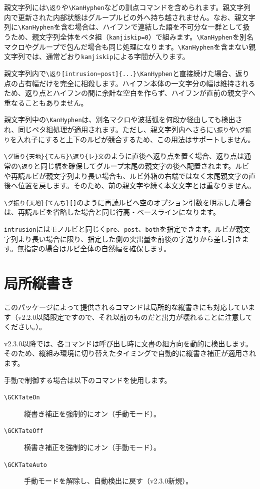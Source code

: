 \documentclass[luatex,fontsize=8pt,paper=b5,twoside]{jlreq}%
\begin{document}
親文字列には\verb|\返り|や\verb|\KanHyphen|などの訓点コマンドを含められます。親文字列内で更新された内部状態はグループルビの外へ持ち越されません。なお、親文字列に\verb|\KanHyphen|を含む場合は、ハイフンで連結した語を不可分な一群として扱うため、親文字列全体をベタ組（\verb|kanjiskip=0|）で組みます。\verb|\KanHyphen|を別名マクロやグループで包んだ場合も同じ処理になります。\verb|\KanHyphen|を含まない親文字列では、通常どおり\verb|kanjiskip|による字間が入ります。

親文字列内で\verb|\返り[intrusion=post]{...}\KanHyphen|と直接続けた場合、返り点の占有幅だけを完全に相殺します。ハイフン本体の一文字分の幅は維持されるため、返り点とハイフンの間に余計な空白を作らず、ハイフンが直前の親文字へ重なることもありません。

親文字列中の\verb|\KanHyphen|は、別名マクロや波括弧を何段か経由しても検出され、同じベタ組処理が適用されます。ただし、親文字列内へさらに\verb|\振り|や\verb|\グ振り|を入れ子にすると上下のルビが競合するため、この用法はサポートしません。

\verb|\グ振り{天地}{てんち}\返り{レ}文|のように直後へ返り点を置く場合、返り点は通常の\verb|\返り|と同じ幅を確保してグループ末尾の親文字の後へ配置されます。ルビや再読ルビが親文字列より長い場合も、ルビ外箱の右端ではなく末尾親文字の直後へ位置を戻します。そのため、前の親文字や続く本文文字とは重なりません。

\verb|\グ振り{天地}{てんち}[]|のように再読ルビへ空のオプション引数を明示した場合は、再読ルビを省略した場合と同じ行高・ベースラインになります。

\verb|intrusion|にはモノルビと同じく\verb|pre|、\verb|post|、\verb|both|を指定できます。ルビが親文字列より長い場合に限り、指定した側の突出量を前後の字送りから差し引きます。無指定の場合はルビ全体の自然幅を確保します。

\section{局所縦書き}
このパッケージによって提供されるコマンドは局所的な縦書きにも対応しています（v2.2.0以降限定ですので、それ以前のものだと出力が壊れることに注意してください。）。

v2.3.0以降では、各コマンドは呼び出し時に文書の組方向を動的に検出します。そのため、縦組み環境に切り替えたタイミングで自動的に縦書き補正が適用されます。

手動で制御する場合は以下のコマンドを使用します。

\begin{description}
  \item[\texttt{\textbackslash GCKTateOn}] 縦書き補正を強制的にオン（手動モード）。
  \item[\texttt{\textbackslash GCKTateOff}] 横書き補正を強制的にオン（手動モード）。
  \item[\texttt{\textbackslash GCKTateAuto}] 手動モードを解除し、自動検出に戻す（v2.3.0新規）。
\end{description}
\end{document}
